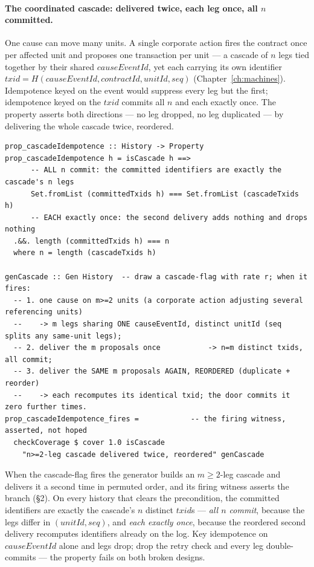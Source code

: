 \paragraph{The coordinated cascade: delivered twice, each leg once, all $n$ committed.}
One cause can move many units. A single corporate action fires the contract once per
affected unit and proposes one transaction per unit --- a cascade of $n$ legs tied
together by their shared $\mathit{causeEventId}$, yet each carrying its own identifier
$\mathit{txid}=H(\mathit{causeEventId},\mathit{contractId},\mathit{unitId},\mathit{seq})$
(Chapter~\ref{ch:machines}). Idempotence keyed on the event would suppress every leg
but the first; idempotence keyed on the $\mathit{txid}$ commits all $n$ and each
exactly once. The property asserts both directions --- no leg dropped, no leg
duplicated --- by delivering the whole cascade twice, reordered.

\begin{lstlisting}
prop_cascadeIdempotence :: History -> Property
prop_cascadeIdempotence h = isCascade h ==>
      -- ALL n commit: the committed identifiers are exactly the cascade's n legs
      Set.fromList (committedTxids h) === Set.fromList (cascadeTxids h)
      -- EACH exactly once: the second delivery adds nothing and drops nothing
  .&&. length (committedTxids h) === n
  where n = length (cascadeTxids h)

genCascade :: Gen History  -- draw a cascade-flag with rate r; when it fires:
  -- 1. one cause on m>=2 units (a corporate action adjusting several referencing units)
  --    -> m legs sharing ONE causeEventId, distinct unitId (seq splits any same-unit legs);
  -- 2. deliver the m proposals once           -> n=m distinct txids, all commit;
  -- 3. deliver the SAME m proposals AGAIN, REORDERED (duplicate + reorder)
  --    -> each recomputes its identical txid; the door commits it zero further times.
prop_cascadeIdempotence_fires =            -- the firing witness, asserted, not hoped
  checkCoverage $ cover 1.0 isCascade
    "n>=2-leg cascade delivered twice, reordered" genCascade
\end{lstlisting}

When the cascade-flag fires the generator builds an $m\ge 2$-leg cascade and delivers
it a second time in permuted order, and its firing witness asserts the branch (\S 2). On
every history that clears the
precondition, the committed identifiers are exactly the cascade's $n$ distinct
$\mathit{txid}$s --- \emph{all $n$ commit}, because the legs differ in
$(\mathit{unitId},\mathit{seq})$, and \emph{each exactly once}, because the reordered
second delivery recomputes identifiers already on the log. Key idempotence on
$\mathit{causeEventId}$ alone and legs drop; drop the retry check and every leg
double-commits --- the property fails on both broken designs.

